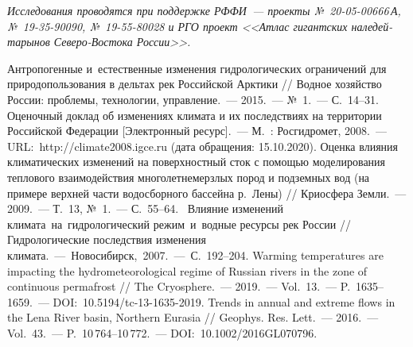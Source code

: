 \textit{Исследования проводятся при поддержке РФФИ~--- проекты №~20-05-00666\,А, №~19-35-90090, №~19-55-80028 и РГО проект <<Атлас гигантских наледей-тарынов Северо-Востока России>>.}

\begin{thebibliography}{99}
\bibitem{} Антропогенные и~естественные изменения гидрологических ограничений для природопользования в дельтах рек Российской Арктики // Водное хозяйство России: проблемы, технологии, управление.~--- 2015.~--- №~1.~--- С.~14--31.
\bibitem{}Оценочный доклад об изменениях климата и их последствиях на территории Российской Федерации [Электронный ресурс].~--- М.~: Росгидромет, 2008.~--- URL:~http://climate2008.igce.ru (дата обращения: 15.10.2020).
\bibitem{} Оценка влияния климатических изменений на поверхностный сток с помощью моделирования теплового взаимодействия многолетнемерзлых пород и подземных вод (на примере верхней части водосборного бассейна р.~Лены) // Криосфера Земли.~--- 2009.~--- Т.~13, №~1.~--- С.~55--64.
\bibitem{} Влияние изменений климата на гидрологический режим и водные ресурсы рек России // Гидрологические последствия изменения климата.~--- Новосибирск, 2007.~--- С.~192--204.
\bibitem{} Warming temperatures are impacting the hydrometeorological regime of Russian rivers in the zone of continuous permafrost // The Cryosphere.~--- 2019.~--- Vol.~13.~--- P.~1635--1659.~--- DOI:~10.5194/tc-13-1635-2019.
\bibitem{} Trends in annual and extreme flows in the Lena River basin, Northern Eurasia // Geophys. Res. Lett.~--- 2016.~--- Vol.~43.~--- P.~10\,764--10\,772.~--- DOI:~10.1002/2016GL070796.

\end{thebibliography}
